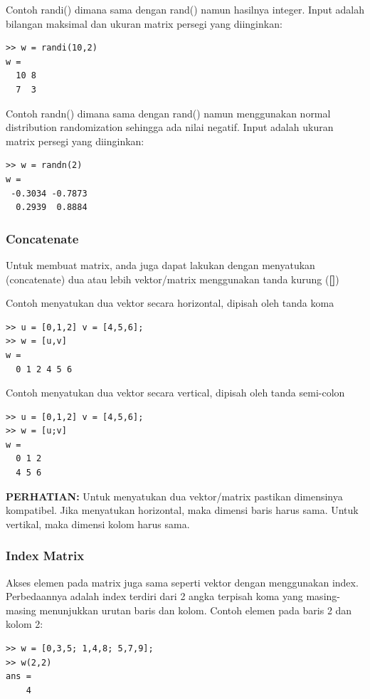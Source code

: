 \documentclass[12pt]{book}
\begin{document}
\begin{itemize}
		Contoh randi() dimana sama dengan rand() namun hasilnya integer. Input adalah bilangan maksimal dan ukuran matrix persegi yang diinginkan:
		\begin{verbatim}
>> w = randi(10,2)
w =
  10 8
  7  3
	\end{verbatim}

	\newpage
	Contoh randn() dimana sama dengan rand() namun menggunakan normal distribution randomization sehingga ada nilai negatif.
	Input adalah ukuran matrix persegi yang diinginkan:
	\begin{verbatim}
>> w = randn(2)
w =
 -0.3034 -0.7873
  0.2939  0.8884
	\end{verbatim}

	\end{itemize}
	
	\subsubsection{Concatenate}
	
	Untuk membuat matrix, anda juga dapat lakukan dengan menyatukan (concatenate) dua atau lebih vektor/matrix menggunakan tanda kurung (\textbf{[]})
	
	Contoh menyatukan dua vektor secara horizontal, dipisah oleh tanda koma
	\begin{verbatim}
>> u = [0,1,2] v = [4,5,6];
>> w = [u,v]
w =
  0 1 2 4 5 6
	\end{verbatim}

	Contoh menyatukan dua vektor secara vertical, dipisah oleh tanda semi-colon
	\begin{verbatim}
>> u = [0,1,2] v = [4,5,6];
>> w = [u;v]
w =
  0 1 2
  4 5 6
	\end{verbatim}

	\textbf{PERHATIAN:} Untuk menyatukan dua vektor/matrix pastikan dimensinya kompatibel.
	Jika menyatukan horizontal, maka dimensi baris harus sama.
	Untuk vertikal, maka dimensi kolom harus sama.
	\subsubsection{Index Matrix}
	
	Akses elemen pada matrix juga sama seperti vektor dengan menggunakan index.
	Perbedaannya adalah index terdiri dari 2 angka terpisah koma yang masing-masing menunjukkan urutan baris dan kolom.
	Contoh elemen pada baris 2 dan kolom 2:
	\begin{verbatim}
>> w = [0,3,5; 1,4,8; 5,7,9];
>> w(2,2)
ans =
    4
	\end{verbatim}
\end{document}

